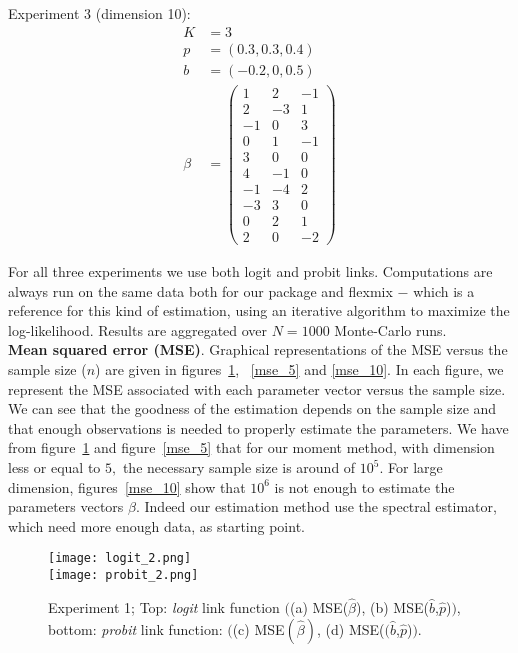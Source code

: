 Experiment 3 (dimension 10):
\begin{align*}
	K &= 3\\
	p &= (0.3, 0.3, 0.4)\\
	b &= (-0.2, 0, 0.5)\\
	\beta &=
		\begin{pmatrix}
			1 & 2 & -1\\
			2 & -3 & 1\\
			-1 & 0 & 3\\
			0 & 1 & -1\\
			3 & 0 & 0\\
			4 & -1 & 0\\
			-1 & -4 & 2\\
			-3 & 3 & 0\\
			0 & 2 & 1\\
			2 & 0 & -2
		\end{pmatrix}
\end{align*}

For all three experiments we use both logit and probit links.
Computations are always run on the same data both for our package and flexmix $-$ which is a reference for this kind of estimation, using an iterative algorithm to maximize the log-likelihood. Results are aggregated over $N=1000$ Monte-Carlo runs.\\


\noindent \textbf{Mean squared error (MSE)}.
Graphical representations of the MSE versus the sample size ($n$) are given in figures~\ref{mse_2}, ~\ref{mse_5} and \ref{mse_10}. In each figure, we represent the MSE associated with each parameter vector versus the sample size. We can see that the goodness of the estimation depends on  the sample size and that enough observations is needed to properly estimate the parameters. We have from figure~\ref{mse_2} and figure~\ref{mse_5} that for our moment method, with dimension less or equal to $5,$ the necessary sample size is around of $10^5.$ For large dimension, figures~\ref{mse_10} show that $10^6$ is not enough to estimate the parameters vectors $\beta.$ Indeed our estimation method use the spectral estimator, which need more enough data, as starting point.\\






\begin{figure}[!!ht!!]
\centering
	\texttt{[image: logit\_2.png]}\\
	\texttt{[image: probit\_2.png]}
	\caption{Experiment 1; Top: \textit{logit} link function $\Big($(a) MSE($\widehat{\beta}$), (b) MSE($\widehat{b}$,$\widehat{p}$)$\Big)$, bottom: \textit{probit} link function: $\Big($(c) MSE$(\widehat{\beta})$, (d) MSE($(\widehat{b}$,$\widehat{p}$)$\Big)$.}
	\label{mse_2}
\end{figure}

